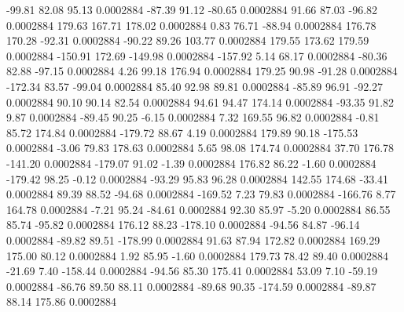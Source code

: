       -99.81       82.08       95.13     0.0002884
      -87.39       91.12      -80.65     0.0002884
       91.66       87.03      -96.82     0.0002884
      179.63      167.71      178.02     0.0002884
        0.83       76.71      -88.94     0.0002884
      176.78      170.28      -92.31     0.0002884
      -90.22       89.26      103.77     0.0002884
      179.55      173.62      179.59     0.0002884
     -150.91      172.69     -149.98     0.0002884
     -157.92        5.14       68.17     0.0002884
      -80.36       82.88      -97.15     0.0002884
        4.26       99.18      176.94     0.0002884
      179.25       90.98      -91.28     0.0002884
     -172.34       83.57      -99.04     0.0002884
       85.40       92.98       89.81     0.0002884
      -85.89       96.91      -92.27     0.0002884
       90.10       90.14       82.54     0.0002884
       94.61       94.47      174.14     0.0002884
      -93.35       91.82        9.87     0.0002884
      -89.45       90.25       -6.15     0.0002884
        7.32      169.55       96.82     0.0002884
       -0.81       85.72      174.84     0.0002884
     -179.72       88.67        4.19     0.0002884
      179.89       90.18     -175.53     0.0002884
       -3.06       79.83      178.63     0.0002884
        5.65       98.08      174.74     0.0002884
       37.70      176.78     -141.20     0.0002884
     -179.07       91.02       -1.39     0.0002884
      176.82       86.22       -1.60     0.0002884
     -179.42       98.25       -0.12     0.0002884
      -93.29       95.83       96.28     0.0002884
      142.55      174.68      -33.41     0.0002884
       89.39       88.52      -94.68     0.0002884
     -169.52        7.23       79.83     0.0002884
     -166.76        8.77      164.78     0.0002884
       -7.21       95.24      -84.61     0.0002884
       92.30       85.97       -5.20     0.0002884
       86.55       85.74      -95.82     0.0002884
      176.12       88.23     -178.10     0.0002884
      -94.56       84.87      -96.14     0.0002884
      -89.82       89.51     -178.99     0.0002884
       91.63       87.94      172.82     0.0002884
      169.29      175.00       80.12     0.0002884
        1.92       85.95       -1.60     0.0002884
      179.73       78.42       89.40     0.0002884
      -21.69        7.40     -158.44     0.0002884
      -94.56       85.30      175.41     0.0002884
       53.09        7.10      -59.19     0.0002884
      -86.76       89.50       88.11     0.0002884
      -89.68       90.35     -174.59     0.0002884
      -89.87       88.14      175.86     0.0002884
